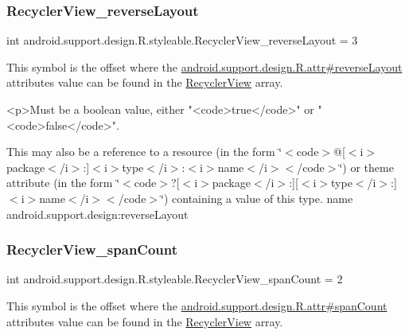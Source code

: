 \subsubsection{\texorpdfstring{Recycler\+View\+\_\+reverse\+Layout}{RecyclerView\_reverseLayout}}
{\footnotesize\ttfamily int android.\+support.\+design.\+R.\+styleable.\+Recycler\+View\+\_\+reverse\+Layout = 3\hspace{0.3cm}{\ttfamily [static]}}

This symbol is the offset where the \hyperlink{classandroid_1_1support_1_1design_1_1R_1_1attr_a2a3ab85c24fa59afc341f28995a2ad4e}{android.\+support.\+design.\+R.\+attr\#reverse\+Layout} attribute\textquotesingle{}s value can be found in the \hyperlink{classandroid_1_1support_1_1design_1_1R_1_1styleable_a1700d79470c52662f934bd53b1a05a14}{Recycler\+View} array.

\begin{DoxyVerb}      <p>Must be a boolean value, either "<code>true</code>" or "<code>false</code>".
\end{DoxyVerb}
 

This may also be a reference to a resource (in the form \char`\"{}$<$code$>$@\mbox{[}$<$i$>$package$<$/i$>$\+:\mbox{]}$<$i$>$type$<$/i$>$\+:$<$i$>$name$<$/i$>$$<$/code$>$\char`\"{}) or theme attribute (in the form \char`\"{}$<$code$>$?\mbox{[}$<$i$>$package$<$/i$>$\+:\mbox{]}\mbox{[}$<$i$>$type$<$/i$>$\+:\mbox{]}$<$i$>$name$<$/i$>$$<$/code$>$\char`\"{}) containing a value of this type.  name android.\+support.\+design\+:reverse\+Layout \mbox{\label{classandroid_1_1support_1_1design_1_1R_1_1styleable_ae1dda25679ae35bb8c63ec940bb9a0fe}} 
\subsubsection{\texorpdfstring{Recycler\+View\+\_\+span\+Count}{RecyclerView\_spanCount}}
{\footnotesize\ttfamily int android.\+support.\+design.\+R.\+styleable.\+Recycler\+View\+\_\+span\+Count = 2\hspace{0.3cm}{\ttfamily [static]}}

This symbol is the offset where the \hyperlink{classandroid_1_1support_1_1design_1_1R_1_1attr_a2b750d4992202f705352197b5671bc88}{android.\+support.\+design.\+R.\+attr\#span\+Count} attribute\textquotesingle{}s value can be found in the \hyperlink{classandroid_1_1support_1_1design_1_1R_1_1styleable_a1700d79470c52662f934bd53b1a05a14}{Recycler\+View} array.

